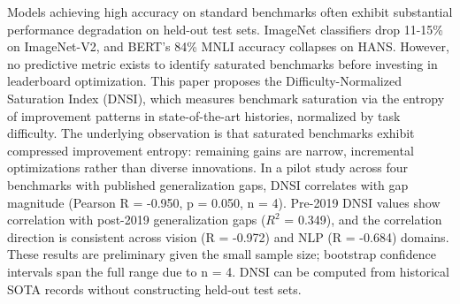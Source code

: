 
Models achieving high accuracy on standard benchmarks often exhibit substantial performance degradation on held-out test sets. ImageNet classifiers drop 11-15\% on ImageNet-V2, and BERT's 84\% MNLI accuracy collapses on HANS. However, no predictive metric exists to identify saturated benchmarks before investing in leaderboard optimization. This paper proposes the Difficulty-Normalized Saturation Index (DNSI), which measures benchmark saturation via the entropy of improvement patterns in state-of-the-art histories, normalized by task difficulty. The underlying observation is that saturated benchmarks exhibit compressed improvement entropy: remaining gains are narrow, incremental optimizations rather than diverse innovations. In a pilot study across four benchmarks with published generalization gaps, DNSI correlates with gap magnitude (Pearson R = -0.950, p = 0.050, n = 4). Pre-2019 DNSI values show correlation with post-2019 generalization gaps ($R^2$ = 0.349), and the correlation direction is consistent across vision (R = -0.972) and NLP (R = -0.684) domains. These results are preliminary given the small sample size; bootstrap confidence intervals span the full range due to n = 4. DNSI can be computed from historical SOTA records without constructing held-out test sets.
